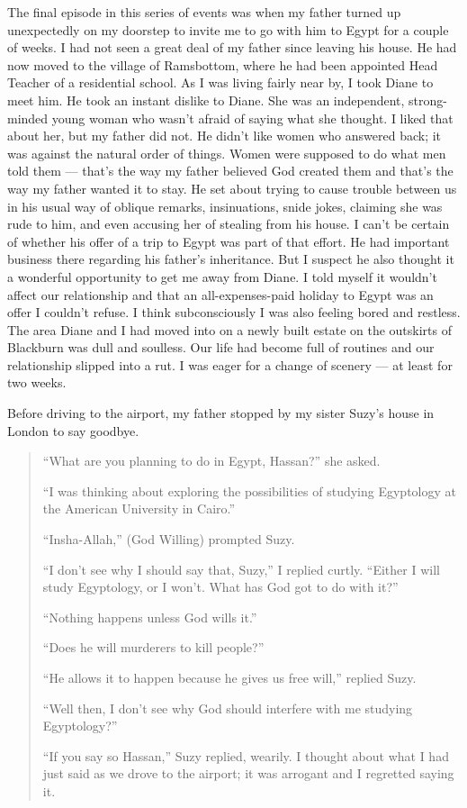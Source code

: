 \documentclass[12pt]{memoir}
\begin{document}
The final episode in this series of events was
when my father turned up unexpectedly on my doorstep
to invite me to go with him to Egypt for a couple of weeks.
I had not seen a great deal of my father since leaving his house.
He had now moved to the village of Ramsbottom,
where he had been appointed Head Teacher of a residential school.
As I was living fairly near by, I took Diane to meet him.
He took an instant dislike to Diane.
She was an independent, strong-minded young woman
who wasn’t afraid of saying what she thought.
I liked that about her, but my father did not.
He didn’t like women who answered back;
it was against the natural order of things.
Women were supposed to do what men told them —
that’s the way my father believed God created them
and that’s the way my father wanted it to stay.
He set about trying to cause trouble between us
in his usual way of oblique remarks, insinuations, snide jokes,
claiming she was rude to him,
and even accusing her of stealing from his house.
I can’t be certain of whether his offer of a trip
to Egypt was part of that effort.
He had important business there regarding his father’s inheritance.
But I suspect he also thought it a wonderful opportunity
to get me away from Diane.
I told myself it wouldn’t affect our relationship and that
an all-expenses-paid holiday to Egypt was an offer I couldn’t refuse.
I think subconsciously I was also feeling bored and restless.
The area Diane and I had moved into on a newly built estate
on the outskirts of Blackburn was dull and soulless.
Our life had become full of routines and our relationship slipped into a rut.
I was eager for a change of scenery — at least for two weeks.

Before driving to the airport,
my father stopped by my sister Suzy’s house in London to say goodbye.

\begin{quote}
“What are you planning to do in Egypt, Hassan?” she asked.

“I was thinking about exploring the possibilities
of studying Egyptology at the American University in Cairo.”

“Insha-Allah,” (God Willing) prompted Suzy.

“I don’t see why I should say that, Suzy,” I replied curtly.
“Either I will study Egyptology, or I won’t.
What has God got to do with it?”

“Nothing happens unless God wills it.”

“Does he will murderers to kill people?”

“He allows it to happen because he gives us free will,” replied Suzy.

“Well then, I don’t see why God should interfere with me studying Egyptology?”

“If you say so Hassan,”
Suzy replied, wearily.
I thought about what I had just said as we drove to the airport;
it was arrogant and I regretted saying it.
\end{quote}
\end{document}
